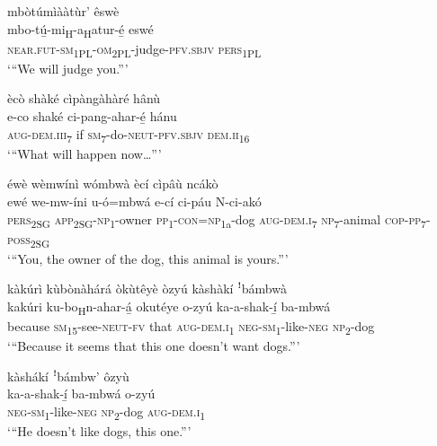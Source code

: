 mbòtúmìààtùr’ êswè\\
\gll mbo-tú̲-mi\textsubscript{H}{}-a\textsubscript{H}atur-é̲      eswé\\
\textsc{near}.\textsc{fut}{}-\textsc{sm}\textsubscript{1PL}{}-\textsc{om}\textsubscript{2PL}{}-judge-\textsc{pfv}.\textsc{sbjv}  \textsc{pers}\textsubscript{1PL}\\
\glt ‘“We will judge you.”’\bigskip

ècò shàké cìpàngàhàré hânù\\
\gll e-co    shaké  ci-pang-ahar-é̲    hánu\\
\textsc{aug}{}-\textsc{dem}.\textsc{iii}\textsubscript{7}  if  \textsc{sm}\textsubscript{7}{}-do-\textsc{neut}{}-\textsc{pfv}.\textsc{sbjv}  \textsc{dem}.\textsc{ii}\textsubscript{16}\\
\glt ‘“What will happen now…”’\bigskip

éwè wèmwínì wómbwà ècí cìpâù ncákò\\
\gll ewé    we-mw-íni    u-ó=mbwá e-cí    ci-páu    N-ci-akó \\
\textsc{pers}\textsubscript{2SG}  \textsc{app}\textsubscript{2SG}{}-\textsc{np}\textsubscript{1}{}-owner  \textsc{pp}\textsubscript{1}{}-\textsc{con}=\textsc{np}\textsubscript{1a}{}-dog
\textsc{aug}{}-\textsc{dem}.\textsc{i}\textsubscript{7}  \textsc{np}\textsubscript{7}{}-animal  \textsc{cop}{}-\textsc{pp}\textsubscript{7}{}-\textsc{poss}\textsubscript{2SG}\\
\glt ‘“You, the owner of the dog, this animal is yours.”’\bigskip

kàkúrì kùbònàhárá òkùtêyè òzyú kàshàkí ꜝbámbwà\\
\gll kakúri    ku-bo\textsubscript{H}n-ahar-á̲  okutéye  o-zyú    ka-a-shak-í̲    ba-mbwá \\
because  \textsc{sm}\textsubscript{15}{}-see-\textsc{neut}{}-\textsc{fv}
that    \textsc{aug}{}-\textsc{dem}.\textsc{i}\textsubscript{1}  \textsc{neg}{}-\textsc{sm}\textsubscript{1}{}-like-\textsc{neg}  \textsc{np}\textsubscript{2}{}-dog\\
\glt ‘“Because it seems that this one doesn’t want dogs.”’\bigskip

kàshákí ꜝbámbw’ ôzyù\\
\gll ka-a-shak-í̲    ba-mbwá  o-zyú\\
\textsc{neg}{}-\textsc{sm}\textsubscript{1}{}-like-\textsc{neg}  \textsc{np}\textsubscript{2}{}-dog  \textsc{aug}{}-\textsc{dem}.\textsc{i}\textsubscript{1}\\
\glt ‘“He doesn’t like dogs, this one.”’\bigskip

